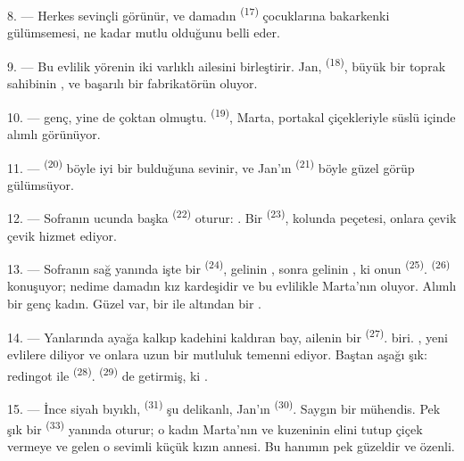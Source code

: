 \VUsaut{3.0mm}

8. --- Herkes sevinçli görünür, ve damadın 
\textsuperscript{(17)} çocuklarına bakarkenki gülümsemesi, ne kadar mutlu
olduğunu belli eder.

9. --- Bu evlilik yörenin iki varlıklı ailesini birleştirir. Jan,
 \textsuperscript{(18)}, büyük bir toprak sahibinin
, ve başarılı bir fabrikatörün  oluyor.

10. ---  genç, yine de  çoktan olmuştu.
 \textsuperscript{(19)}, Marta, portakal çiçekleriyle süslü
 içinde alımlı görünüyor.

11. ---  \textsuperscript{(20)} böyle iyi bir
 bulduğuna sevinir, ve Jan'ın 
\textsuperscript{(21)}  böyle güzel görüp gülümsüyor.

12. --- Sofranın ucunda başka  \textsuperscript{(22)} oturur:
. Bir 
\textsuperscript{(23)}, kolunda peçetesi, onlara çevik çevik hizmet ediyor.

\VUsaut{3.0mm}

13. --- Sofranın sağ yanında işte bir 
\textsuperscript{(24)}, gelinin , sonra gelinin
, ki onun  \textsuperscript{(25)}.
 \textsuperscript{(26)} konuşuyor; nedime damadın kız
kardeşidir ve bu evlilikle Marta'nın  oluyor. Alımlı bir
genç kadın. Güzel  var, bir  ile
altından bir .

14. --- Yanlarında ayağa kalkıp kadehini kaldıran bay, ailenin bir
 \textsuperscript{(27)}. 
biri. , yeni evlilere  diliyor ve onlara
uzun bir mutluluk temenni ediyor. Baştan aşağı şık: redingot ile
 \textsuperscript{(28)}. 
\textsuperscript{(29)} de getirmiş, ki .

15. --- İnce siyah bıyıklı,  \textsuperscript{(31)} şu
delikanlı, Jan'ın  \textsuperscript{(30)}. Saygın bir
mühendis. Pek şık bir  \textsuperscript{(33)} yanında
oturur; o kadın Marta'nın  ve kuzeninin elini tutup çiçek
vermeye ve   gelen o sevimli küçük
kızın annesi. Bu hanımın  pek güzeldir ve
 özenli.

